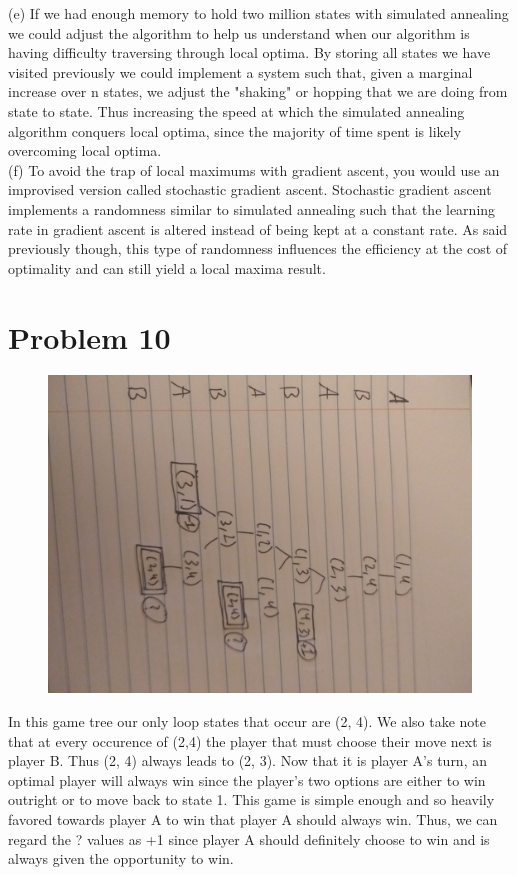 \documentclass[12pt]{article}
\begin{document}
(e) If we had enough memory to hold two million states with simulated annealing we could adjust the algorithm to help us understand when our algorithm is having difficulty traversing through local optima. By storing all states we have visited previously we could implement a system such that, given a marginal increase over n states, we adjust the "shaking" or hopping that we are doing from state to state. Thus increasing the speed at which the simulated annealing algorithm conquers local optima, since the majority of time spent is likely overcoming local optima. \\
(f) To avoid the trap of local maximums with gradient ascent, you would use an improvised version called stochastic gradient ascent. Stochastic gradient ascent implements a randomness similar to simulated annealing such that the learning rate in gradient ascent is altered instead of being kept at a constant rate. As said previously though, this type of randomness influences the efficiency at the cost of optimality and can still yield a local maxima result.

\section *{Problem 10}
\begin{figure}[!htb]
	\centering
	\includegraphics[width=.5\textwidth,angle=270, origin=c]{problem10.jpg}
\end{figure} 
In this game tree our only loop states that occur are (2, 4). We also take note that at every occurence of (2,4) the player that must choose their move next is player B. Thus (2, 4) always leads to (2, 3). Now that it is player A's turn, an optimal player will always win since the player's two options are either to win outright or to move back to state 1. This game is simple enough and so heavily favored towards player A to win that player A should always win. Thus, we can regard the ? values as +1 since player A should definitely choose to win and is always given the opportunity to win.
\end{document}

